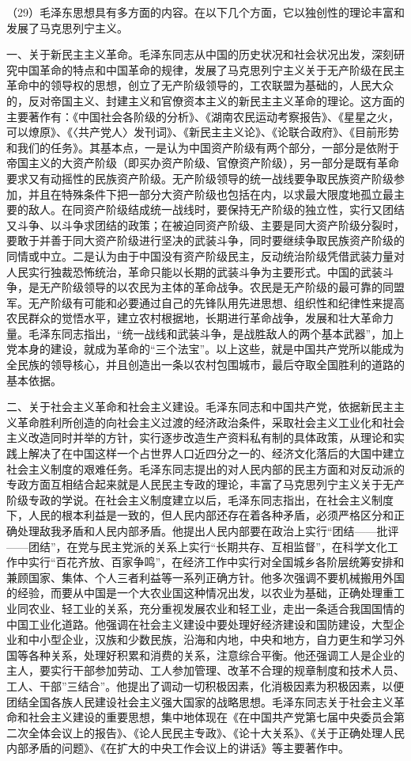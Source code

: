 （29）毛泽东思想具有多方面的内容。在以下几个方面，它以独创性的理论丰富和发展了马克思列宁主义。

一、关于新民主主义革命。毛泽东同志从中国的历史状况和社会状况出发，深刻研究中国革命的特点和中国革命的规律，发展了马克思列宁主义关于无产阶级在民主革命中的领导权的思想，创立了无产阶级领导的，工农联盟为基础的，人民大众的，反对帝国主义、封建主义和官僚资本主义的新民主主义革命的理论。这方面的主要著作有：《中国社会各阶级的分析》、《湖南农民运动考察报告》、《星星之火，可以燎原》、《〈共产党人〉发刊词》、《新民主主义论》、《论联合政府》、《目前形势和我们的任务》。其基本点，一是认为中国资产阶级有两个部分，一部分是依附于帝国主义的大资产阶级（即买办资产阶级、官僚资产阶级），另一部分是既有革命要求又有动摇性的民族资产阶级。无产阶级领导的统一战线要争取民族资产阶级参加，并且在特殊条件下把一部分大资产阶级也包括在内，以求最大限度地孤立最主要的敌人。在同资产阶级结成统一战线时，要保持无产阶级的独立性，实行又团结又斗争、以斗争求团结的政策；在被迫同资产阶级、主要是同大资产阶级分裂时，要敢于并善于同大资产阶级进行坚决的武装斗争，同时要继续争取民族资产阶级的同情或中立。二是认为由于中国没有资产阶级民主，反动统治阶级凭借武装力量对人民实行独裁恐怖统治，革命只能以长期的武装斗争为主要形式。中国的武装斗争，是无产阶级领导的以农民为主体的革命战争。农民是无产阶级的最可靠的同盟军。无产阶级有可能和必要通过自己的先锋队用先进思想、组织性和纪律性来提高农民群众的觉悟水平，建立农村根据地，长期进行革命战争，发展和壮大革命力量。毛泽东同志指出，“统一战线和武装斗争，是战胜敌人的两个基本武器”，加上党本身的建设，就成为革命的“三个法宝”。以上这些，就是中国共产党所以能成为全民族的领导核心，并且创造出一条以农村包围城市，最后夺取全国胜利的道路的基本依据。

二、关于社会主义革命和社会主义建设。毛泽东同志和中国共产党，依据新民主主义革命胜利所创造的向社会主义过渡的经济政治条件，采取社会主义工业化和社会主义改造同时并举的方针，实行逐步改造生产资料私有制的具体政策，从理论和实践上解决了在中国这样一个占世界人口近四分之一的、经济文化落后的大国中建立社会主义制度的艰难任务。毛泽东同志提出的对人民内部的民主方面和对反动派的专政方面互相结合起来就是人民民主专政的理论，丰富了马克思列宁主义关于无产阶级专政的学说。在社会主义制度建立以后，毛泽东同志指出，在社会主义制度下，人民的根本利益是一致的，但人民内部还存在着各种矛盾，必须严格区分和正确处理敌我矛盾和人民内部矛盾。他提出人民内部要在政治上实行“团结——批评——团结”，在党与民主党派的关系上实行“长期共存、互相监督”，在科学文化工作中实行“百花齐放、百家争鸣”，在经济工作中实行对全国城乡各阶层统筹安排和兼顾国家、集体、个人三者利益等一系列正确方针。他多次强调不要机械搬用外国的经验，而要从中国是一个大农业国这种情况出发，以农业为基础，正确处理重工业同农业、轻工业的关系，充分重视发展农业和轻工业，走出一条适合我国国情的中国工业化道路。他强调在社会主义建设中要处理好经济建设和国防建设，大型企业和中小型企业，汉族和少数民族，沿海和内地，中央和地方，自力更生和学习外国等各种关系，处理好积累和消费的关系，注意综合平衡。他还强调工人是企业的主人，要实行干部参加劳动、工人参加管理、改革不合理的规章制度和技术人员、工人、干部”三结合”。他提出了调动一切积极因素，化消极因素为积极因素，以便团结全国各族人民建设社会主义强大国家的战略思想。毛泽东同志关于社会主义革命和社会主义建设的重要思想，集中地体现在《在中国共产党第七届中央委员会第二次全体会议上的报告》、《论人民民主专政》、《论十大关系》、《关于正确处理人民内部矛盾的问题》、《在扩大的中央工作会议上的讲话》等主要著作中。

